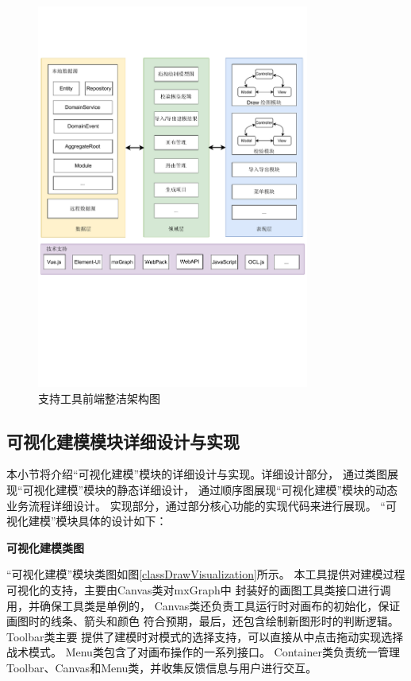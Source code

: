 \begin{figure}[htb] %
    \centering %
    \includegraphics[width=0.8\textwidth]{FIGs/chapter4/frontarchitecture.pdf} %
    \caption{支持工具前端整洁架构图} %
    \label{frontarchitecture} %
\end{figure}%


\subsection{可视化建模模块详细设计与实现}

本小节将介绍“可视化建模”模块的详细设计与实现。详细设计部分，
通过类图展现“可视化建模”模块的静态详细设计，
通过顺序图展现“可视化建模”模块的动态业务流程详细设计。
实现部分，通过部分核心功能的实现代码来进行展现。
“可视化建模”模块具体的设计如下：

\textbf{可视化建模类图}

“可视化建模”模块类图如图\ref{classDrawVisualization}所示。
本工具提供对建模过程可视化的支持，主要由Canvas类对mxGraph中
封装好的画图工具类接口进行调用，并确保工具类是单例的，
Canvas类还负责工具运行时对画布的初始化，保证画图时的线条、箭头和颜色
符合预期，最后，还包含绘制新图形时的判断逻辑。Toolbar类主要
提供了建模时对模式的选择支持，可以直接从中点击拖动实现选择战术模式。
Menu类包含了对画布操作的一系列接口。
Container类负责统一管理Toolbar、Canvas和Menu类，并收集反馈信息与用户进行交互。


